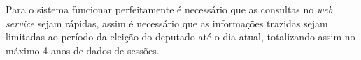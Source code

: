 Para o sistema funcionar perfeitamente é necessário que as consultas no \textit{web service} sejam rápidas, assim é necessário que as informações trazidas sejam limitadas ao período da eleição do deputado até o dia atual, totalizando assim no máximo 4 anos de dados de sessões.